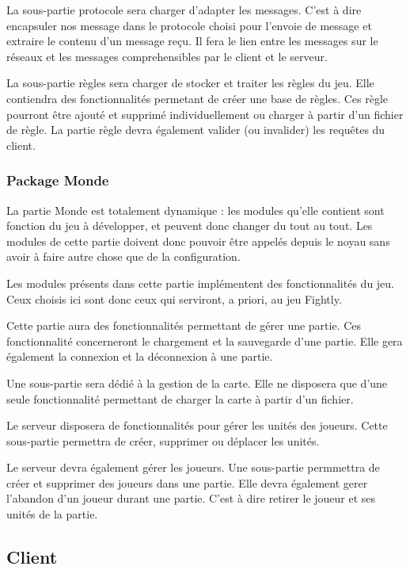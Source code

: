 \documentclass[a4paper,10pt]{report}
\begin{document}
          La sous-partie protocole sera charger d'adapter les messages. C'est à dire encapsuler nos message dans le protocole choisi pour l'envoie de message et extraire le contenu d'un message reçu. Il fera le lien entre les messages sur le réseaux et les messages comprehensibles par le client et le serveur.

          La sous-partie règles sera charger de stocker et traiter les règles du jeu. Elle contiendra des fonctionnalités permetant de créer une base de règles. Ces règle pourront être ajouté et supprimé individuellement ou charger à partir d'un fichier de règle. La partie règle devra également valider (ou invalider) les requêtes du client.

        \subsubsection{Package Monde}

          La partie Monde est totalement dynamique : les modules qu'elle contient sont fonction du jeu à développer, et peuvent donc changer du tout au tout. Les modules de cette partie doivent donc pouvoir être appelés depuis le noyau sans avoir à faire autre chose que de la configuration. 

          Les modules présents dans cette partie implémentent des fonctionnalités du jeu. Ceux choisis ici sont donc ceux qui serviront, a priori, au jeu Fightly.

          Cette partie aura des fonctionnalités permettant de gérer une partie. Ces fonctionnalité concerneront le chargement et la sauvegarde d'une partie. Elle gera également la connexion et la déconnexion à une partie.

          Une sous-partie sera dédié à la gestion de la carte. Elle ne disposera que d'une seule fonctionnalité permettant de charger la carte à partir d'un fichier.

          Le serveur disposera de fonctionnalités pour gérer les unités des joueurs. Cette sous-partie permettra de créer, supprimer ou déplacer les unités.

          Le serveur devra également gérer les joueurs. Une sous-partie permmettra de créer et supprimer des joueurs dans une partie. Elle devra également gerer l'abandon d'un joueur durant une partie. C'est à dire retirer le joueur et ses unités de la partie.

      \subsection{Client}
\end{document}

